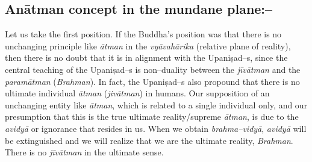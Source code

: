\subsection*{Anātman concept in the mundane plane:–}

Let us take the first position. If the Buddha’s position was that there is no unchanging principle like \textit{ātman} in the \textit{vyāvahārika} (relative plane of reality), then there is no doubt that it is in alignment with the Upaniṣad–s, since the central teaching of the Upaniṣad–s is non–duality between the \textit{jīvātman} and the \textit{paramātman} (\textit{Brahman}). In fact, the Upaniṣad–s also propound that there is no ultimate individual \textit{ātman} (\textit{jivātman}) in humans. Our supposition of an unchanging entity like \textit{ātman}, which is related to a single individual only, and our presumption that this is the true ultimate reality/supreme \textit{ātman}, is due to the \textit{avidyā} or ignorance that resides in us. When we obtain \textit{brahma–vidyā}, \textit{avidyā} will be extinguished and we will realize that we are the ultimate reality, \textit{Brahman}. There is no \textit{jīvātman} in the ultimate sense.

